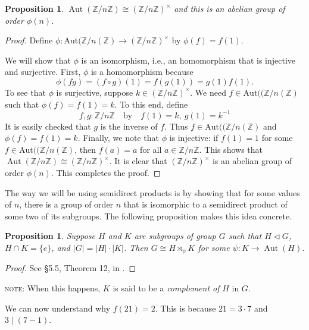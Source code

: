 \documentclass[12pt,reqno]{amsart}
\theoremstyle{plain}
\newtheorem{prop}[thm]{Proposition}
\theoremstyle{definition}
\numberwithin{equation}{section}
\begin{document}
\begin{prop}
$\operatorname{Aut}(\mathbb{Z}/n\mathbb{Z})\cong(\mathbb{Z}/n\mathbb{Z})^{\times}$ and this is an abelian group of order $\phi(n)$.
\end{prop}
\begin{proof}
Define $\phi : \mathrm{Aut}(\mathbb Z/n(\mathbb Z)\to (\mathbb Z/n\mathbb Z)^\times$ by $\phi(f)=f(1)$. 

We will show that $\phi$ is an isomorphism, i.e., an homomorphism that is injective and surjective. 
First, $\phi$ is a homomorphism because  \[ \phi(fg)=(f\circ g)(1)=f(g(1)) = g(1)f(1).\] To see that $\phi$ is surjective, suppose $k\in (\mathbb Z/n\mathbb Z)^\times$. We need $f\in \mathrm{Aut}((\mathbb Z/n(\mathbb Z)$ such that $\phi(f)=f(1)=k$. To this end, define \[ f, g : \mathbb Z/n\mathbb Z \quad \text{by}\quad f(1)=k, \ g(1)=k^{-1}\] It is easily checked that $g$ is the inverse of $f$. Thus $f\in \mathrm{Aut}((\mathbb Z/n(\mathbb Z)$ and  $\phi(f)=f(1)=k$. Finally, we note that $\phi$ is injective: if $f(1)=1$ for some $f\in \mathrm{Aut}((\mathbb Z/n(\mathbb Z)$, then $f(a)=a$ for all $a\in \mathbb Z/n\mathbb Z$. This shows that $\operatorname{Aut}(\mathbb{Z}/n\mathbb{Z})\cong(\mathbb{Z}/n\mathbb{Z})^{\times}$. It is clear that $(\mathbb Z/n\mathbb Z)^\times$ is an abelian group of order $\phi(n)$. This completes the proof.
\end{proof}

\medskip
The way we will be using semidirect products is by showing that for some values of $n$, there is a group of order $n$ that is isomorphic to a semidirect product of some two of its subgroups. The following proposition makes this idea concrete.

\begin{prop}
Suppose $H$ and $K$ are subgroups of group $G$ such that $H\triangleleft G$, $H\cap K=\{e\}$, and $|G|=|H|\cdot|K|$. Then $G\cong H\rtimes_{\psi}K$ for some $\psi:K\rightarrow \operatorname{Aut}(H)$.
\end{prop}
\begin{proof}
    See \S 5.5, Theorem 12, in \cite{DummitFoote}.
\end{proof}
\noindent \textsc{note:} When this happens, $K$ is said to be a \textit{complement of} $H$ in $G$.

We can now understand why $f(21)=2$. This is because $21=3\cdot7$ and $3 \mid (7-1)$.
\end{document}
